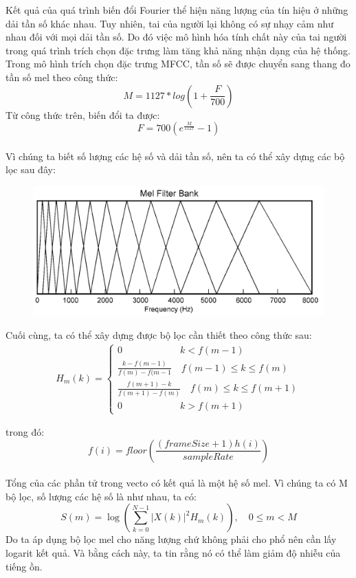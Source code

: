 \documentclass[13pt]{extreport}
\begin{document}
Kết quả của quá trình biến đổi Fourier thể hiện năng lượng của tín hiệu ở những dải tần số khác nhau. Tuy nhiên, tai của người lại không có sự nhạy cảm như nhau đối với mọi dải tần số. Do đó việc mô hình hóa tính chất này của tai người trong quá trình trích chọn đặc trưng làm tăng khả năng nhận dạng của hệ thống. Trong mô hình trích chọn đặc trưng MFCC, tần số sẽ được chuyển sang thang đo tần số mel theo công thức:
$$M=1127*log\left(1+\frac{F}{700}\right)$$
Từ công thức trên, biến đổi ta được:
$$F=700\left(e^{\frac{M}{1127}}-1\right)$$
\\
Vì chúng ta biết số lượng các hệ số và dải tần số, nên ta có thể xây dựng các bộ lọc sau đây:
\begin{figure}[H]
\begin{center}
\includegraphics[scale=0.3]{./uploads_new/Hidden_Markov_Model_1._Mo_hinh_Markov_Vi.docx_DIR/media/anh2.png}
\end{center}
\end{figure}

Cuối cùng, ta có thể xây dựng được bộ lọc cần thiết theo công thức sau:
\begin{align}{H_m(k)=}
\nonumber
    \begin{cases}
        0 \quad \quad \quad \quad \quad \quad k<f(m-1) \\
        \frac{k-f(m-1)}{f(m)-f(m-1} \quad f(m-1)\le k \le f(m) \\
        \frac{f(m+1)-k}{f(m+1)-f(m)} \quad f(m)\le k \le f(m+1)\\
        0 \quad \quad \quad \quad \quad \quad k>f(m+1)
    \end{cases}
\end{align}

trong đó: $$f(i)=floor\left(\frac{(frameSize+1)h(i)}{sampleRate}\right)$$
\\
Tổng của các phần tử trong vecto có kết quả là một hệ số mel. Vì chúng ta có M bộ lọc, số lượng các hệ số là như nhau, ta có: 
$$S(m)=\log\left(\sum_{k=0}^{N-1} |X(k)|^2 H_m(k)\right), \quad 0\le m <M$$
Do ta áp dụng bộ lọc mel cho năng lượng chứ không phải cho phổ nên cần lấy logarit kết quả. Và bằng cách  này, ta tin rằng nó có thể làm giảm độ nhiễu của tiếng ồn.
\end{document}
